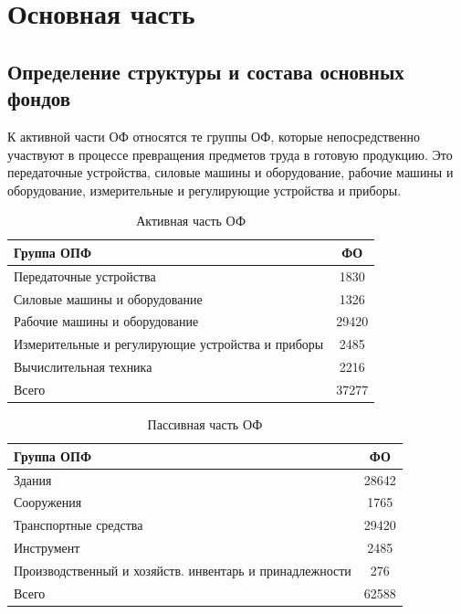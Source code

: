 \chapter{Основная часть}

\section{Определение структуры и состава основных фондов}

К активной части ОФ относятся те группы ОФ, которые непосредственно участвуют в процессе превращения предметов труда в готовую продукцию. Это передаточные устройства, силовые машины и оборудование, рабочие машины и оборудование, измерительные и регулирующие устройства и приборы.

\begin{table}[H]
	\caption{Активная часть ОФ}
	\label{tbl:active_struct}
	\centering
	
	\begin{tabular}{|l|c|}
		\hline
		Группа ОПФ & ФО \\ \hline
		Передаточные устройства & 1830 \\ \hline
		Силовые машины и оборудование & 1326 \\ \hline
		Рабочие  машины и оборудование & 29420 \\ \hline
		Измерительные и регулирующие устройства и приборы & 2485  \\ \hline
		Вычислительная техника & 2216 \\ \hline
		Всего & 37277 \\ \hline
	\end{tabular}
\end{table}

\begin{table}[H]
	\caption{Пассивная часть ОФ}
	\label{tbl:passive_struct}
	\centering
	
	\begin{tabular}{|l|c|}
		\hline
		Группа ОПФ & ФО \\ \hline
		Здания & 28642 \\ \hline
		Сооружения & 1765 \\ \hline
		Транспортные средства & 29420 \\ \hline
		Инструмент & 2485  \\ \hline
		Производственный и хозяйств. инвентарь и принадлежности & 276 \\ \hline
		Всего & 62588 \\ \hline
	\end{tabular}
\end{table}

